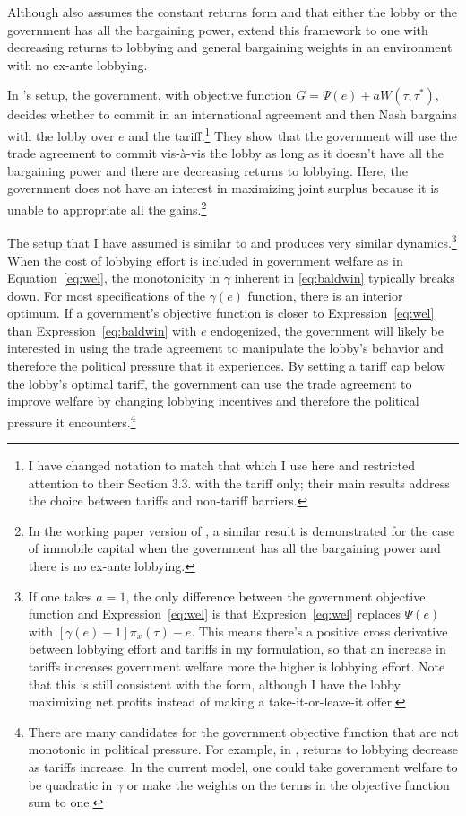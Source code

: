 \documentclass[12pt,titlepage]{article}
\newcommand{\ga}{\gamma}
\begin{document}
Although \Textcite{mrc2007} also assumes the constant returns form and that either the lobby or the government has all the bargaining power, \Textcite{lt} extend this framework to one with decreasing returns to lobbying and general bargaining weights in an environment with no ex-ante lobbying.

In \Textcite{lt}'s setup, the government, with objective function $G = \Psi(e) + aW(\tau,\tau^*)$, decides whether to commit in an international agreement and then Nash bargains with the lobby over $e$ and the tariff.\footnote{I have changed notation to match that which I use here and restricted attention to their Section 3.3. with the tariff only; their main results address the choice between tariffs and non-tariff barriers.} They show that the government will use the trade agreement to commit vis-\`{a}-vis the lobby as long as it doesn't have all the bargaining power and there are decreasing returns to lobbying. Here, the government does not have an interest in maximizing joint surplus because it is unable to appropriate all the gains.\footnote{In the working paper version of \Textcite{mrc2007}, a similar result is demonstrated for the case of immobile capital when the government has all the bargaining power and there is no ex-ante lobbying.}

The setup that I have assumed is similar to \Textcite{lt} and produces very similar dynamics.\footnote{If one takes $a=1$, the only difference between the \Textcite{lt} government objective function and Expression~\ref{eq:wel} is that Expresion~\ref{eq:wel} replaces $\Psi(e)$ with $[\ga(e) - 1]\pi_x(\tau) - e$. This means there's a positive cross derivative between lobbying effort and tariffs in my formulation, so that an increase in tariffs increases government welfare more the higher is lobbying effort. Note that this is still consistent with the \Textcite{dgh97} form, although I have the lobby maximizing net profits instead of making a take-it-or-leave-it offer. } When the cost of lobbying effort is included in government welfare as in Equation~\ref{eq:wel}, the monotonicity in $\ga$ inherent in \ref{eq:baldwin} typically breaks down. For most specifications of the $\ga(e)$ function, there is an interior optimum. If a government's objective function is closer to Expression~\ref{eq:wel} than Expression~\ref{eq:baldwin} with $e$ endogenized, the government will likely be interested in using the trade agreement to manipulate the lobby's behavior and therefore the political pressure that it experiences. By setting a tariff cap below the lobby's optimal tariff, the government can use the trade agreement to improve welfare by changing lobbying incentives and therefore the political pressure it encounters.\footnote{There are many candidates for the government objective function that are not monotonic in political pressure. For example, in \Textcite{ethier2012}, returns to lobbying decrease as tariffs increase. In the current model, one could take government welfare to be quadratic in $\ga$ or make the weights on the terms in the objective function sum to one.}
\end{document}
